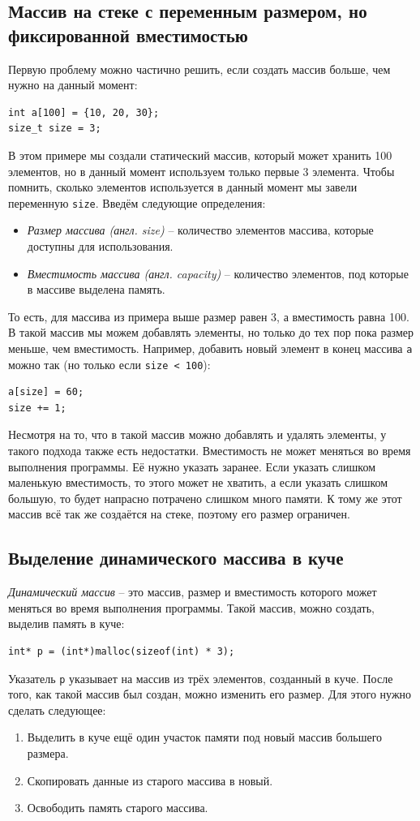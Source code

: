 \documentclass[10pt]{article}
\begin{document}
\subsection*{Массив на стеке с переменным размером, но фиксированной вместимостью}
Первую проблему можно частично решить, если создать массив больше, чем нужно на данный момент:
\begin{lstlisting}
int a[100] = {10, 20, 30};
size_t size = 3;
\end{lstlisting}
В этом примере мы создали статический массив, который может хранить 100 элементов, но в данный момент используем только первые 3 элемента. Чтобы помнить, сколько элементов используется в данный момент мы завели переменную \texttt{size}. Введём следующие определения:
\begin{itemize}
\item \textit{Размер массива (англ. size)} -- количество элементов массива, которые доступны для использования.
\item \textit{Вместимость массива (англ. capacity)} -- количество элементов, под которые в массиве выделена память.
\end{itemize}
То есть, для массива из примера выше размер равен 3, а вместимость равна 100.
В такой массив мы можем добавлять элементы, но только до тех пор пока размер меньше, чем вместимость. Например, добавить новый элемент в конец массива \texttt{a} можно так (но только если \texttt{size < 100}):
\begin{lstlisting}
a[size] = 60;
size += 1;
\end{lstlisting}
Несмотря на то, что в такой массив можно добавлять и удалять элементы, у такого подхода также есть недостатки. Вместимость не может меняться во время выполнения программы. Её нужно указать заранее. Если указать слишком маленькую вместимость, то этого может не хватить, а если указать слишком большую, то будет напрасно потрачено слишком много памяти. К тому же этот массив всё так же создаётся на стеке, поэтому его размер ограничен.

\subsection*{Выделение динамического массива в куче}
\textit{Динамический массив} -- это массив, размер и вместимость которого может меняться во время выполнения программы. Такой массив, можно создать, выделив память в куче:
\begin{lstlisting}
int* p = (int*)malloc(sizeof(int) * 3);
\end{lstlisting}
Указатель \texttt{p} указывает на массив из трёх элементов, созданный в куче.
После того, как такой массив был создан, можно изменить его размер. Для этого нужно сделать следующее:
\begin{enumerate}
\item Выделить в куче ещё один участок памяти под новый массив большего размера.
\item Скопировать данные из старого массива в новый.
\item Освободить память старого массива.
\end{enumerate}
\end{document}
